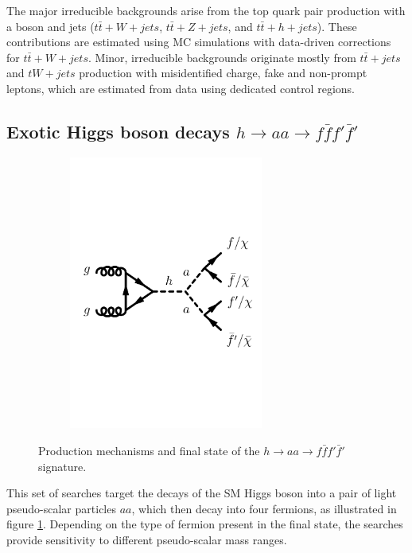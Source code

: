 The major irreducible backgrounds arise from the top quark pair production with a boson and jets ($t\bar{t}+W+jets$, $t\bar{t}+Z+jets$, and $t\bar{t}+h+jets$). These contributions are estimated using MC simulations with data-driven corrections for $t\bar{t}+W+jets$. Minor, irreducible backgrounds originate mostly from $t\bar{t}+jets$ and $tW+jets$ production with misidentified charge, fake and non-prompt leptons, which are estimated from data using dedicated control regions.

\subsection{Exotic Higgs boson decays \texorpdfstring{$h\rightarrow aa\rightarrow f\bar{f}f'\bar{f}'$}{TEXT}}

\begin{figure}[h!]
    \centering
    \begin{subfigure}[3]{0.48\textwidth}
        \centering
        \includegraphics[width=0.7\textwidth]{figures/fig_01g.pdf}
    \end{subfigure}
    \caption{Production mechanisms and final state of the $h\rightarrow aa\rightarrow f\bar{f}f'\bar{f}'$ signature.}
    \label{fig:haaff-signature}
\end{figure} 

This set of searches target the decays of the SM Higgs boson into a pair of light pseudo-scalar particles $aa$, which then decay into four fermions, as illustrated in figure \ref{fig:haaff-signature}. Depending on the type of fermion present in the final state, the searches provide sensitivity to different pseudo-scalar mass ranges.

